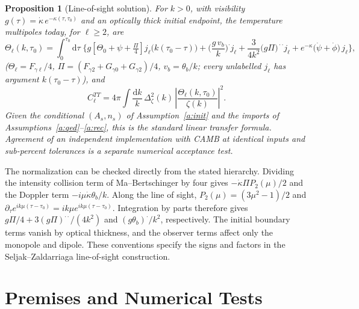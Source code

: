 \documentclass[11pt]{article}
\newtheorem{proposition}[theorem]{Proposition}
\theoremstyle{remark}
\newcommand{\Dd}{\mathrm{d}}
\newcommand{\kdot}{\dot\kappa}
\begin{document}
\begin{proposition}[Line-of-sight solution]\label{p:los}
For $k>0$, with visibility $g(\tau)=\kdot\,e^{-\kappa(\tau,\tau_0)}$ and an
optically thick initial endpoint, the temperature multipoles today, for
$\ell\geq2$, are
\[
\Theta_\ell(k,\tau_0)=\int_0^{\tau_0}\!\Dd\tau\;
\Big\{
g\left[\Theta_0+\psi+\tfrac{\Pi}{4}\right]
j_\ell\big(k(\tau_0-\tau)\big)
+\Big(\frac{g\,v_b}{k}\Big)^{\!\cdot} j_\ell
+\frac{3}{4k^2}\big(g\Pi\big)^{\!\cdot\cdot}j_\ell
+e^{-\kappa}\big(\dot\psi+\dot\phi\big)\,j_\ell
\Big\},
\]
($\Theta_\ell=F_{\gamma\ell}/4$,
$\Pi=(F_{\gamma2}+G_{\gamma0}+G_{\gamma2})/4$,
$v_b=\theta_b/k$; every unlabelled
$j_\ell$ has argument $k(\tau_0-\tau)$), and
\[
C_\ell^{TT}=4\pi\!\int\!\frac{\Dd k}{k}\,
\Delta_\zeta^2(k)\,\left|\frac{\Theta_\ell(k,\tau_0)}{\zeta(k)}\right|^2 .
\]
Given the conditional $(A_s,n_s)$ of Assumption~\ref{a:init} and the imports of
Assumptions~\ref{a:qed}--\ref{a:rec}, this is the standard linear transfer
formula. Agreement of an independent implementation with CAMB at identical
inputs and sub-percent tolerances is a separate numerical acceptance test.
\end{proposition}

The normalization can be checked directly from the stated hierarchy.
Dividing the intensity collision term of Ma--Bertschinger by four gives
$-\kdot\Pi P_2(\mu)/2$ and the Doppler term $-i\mu\kdot\theta_b/k$.
Along the line of sight, $P_2(\mu)=(3\mu^2-1)/2$ and
$\partial_\tau e^{ik\mu(\tau-\tau_0)}=ik\mu e^{ik\mu(\tau-\tau_0)}$.
Integration by parts therefore gives $g\Pi/4+3(g\Pi)^{\cdot\cdot}/(4k^2)$
and $(g\theta_b)^{\cdot}/k^2$, respectively. The initial boundary terms
vanish by optical thickness, and the observer terms affect only the
monopole and dipole. These conventions specify the signs and factors in
the Seljak--Zaldarriaga line-of-sight construction.

\section{Premises and Numerical Tests}\label{s:premises}
\end{document}
